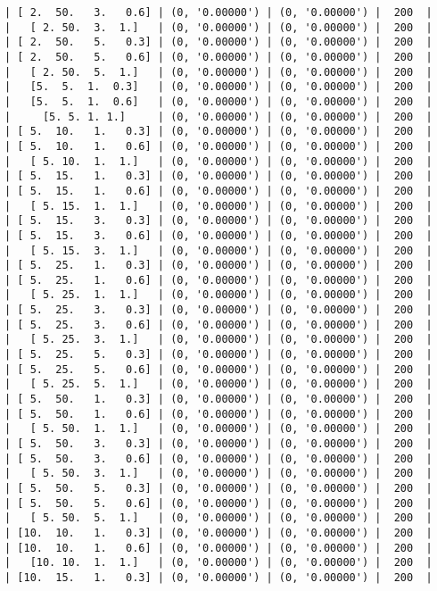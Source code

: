 \documentclass{article}
\begin{document}
\begin{verbatim}
| [ 2.  50.   3.   0.6] | (0, '0.00000') | (0, '0.00000') |  200  |
|   [ 2. 50.  3.  1.]   | (0, '0.00000') | (0, '0.00000') |  200  |
| [ 2.  50.   5.   0.3] | (0, '0.00000') | (0, '0.00000') |  200  |
| [ 2.  50.   5.   0.6] | (0, '0.00000') | (0, '0.00000') |  200  |
|   [ 2. 50.  5.  1.]   | (0, '0.00000') | (0, '0.00000') |  200  |
|   [5.  5.  1.  0.3]   | (0, '0.00000') | (0, '0.00000') |  200  |
|   [5.  5.  1.  0.6]   | (0, '0.00000') | (0, '0.00000') |  200  |
|     [5. 5. 1. 1.]     | (0, '0.00000') | (0, '0.00000') |  200  |
| [ 5.  10.   1.   0.3] | (0, '0.00000') | (0, '0.00000') |  200  |
| [ 5.  10.   1.   0.6] | (0, '0.00000') | (0, '0.00000') |  200  |
|   [ 5. 10.  1.  1.]   | (0, '0.00000') | (0, '0.00000') |  200  |
| [ 5.  15.   1.   0.3] | (0, '0.00000') | (0, '0.00000') |  200  |
| [ 5.  15.   1.   0.6] | (0, '0.00000') | (0, '0.00000') |  200  |
|   [ 5. 15.  1.  1.]   | (0, '0.00000') | (0, '0.00000') |  200  |
| [ 5.  15.   3.   0.3] | (0, '0.00000') | (0, '0.00000') |  200  |
| [ 5.  15.   3.   0.6] | (0, '0.00000') | (0, '0.00000') |  200  |
|   [ 5. 15.  3.  1.]   | (0, '0.00000') | (0, '0.00000') |  200  |
| [ 5.  25.   1.   0.3] | (0, '0.00000') | (0, '0.00000') |  200  |
| [ 5.  25.   1.   0.6] | (0, '0.00000') | (0, '0.00000') |  200  |
|   [ 5. 25.  1.  1.]   | (0, '0.00000') | (0, '0.00000') |  200  |
| [ 5.  25.   3.   0.3] | (0, '0.00000') | (0, '0.00000') |  200  |
| [ 5.  25.   3.   0.6] | (0, '0.00000') | (0, '0.00000') |  200  |
|   [ 5. 25.  3.  1.]   | (0, '0.00000') | (0, '0.00000') |  200  |
| [ 5.  25.   5.   0.3] | (0, '0.00000') | (0, '0.00000') |  200  |
| [ 5.  25.   5.   0.6] | (0, '0.00000') | (0, '0.00000') |  200  |
|   [ 5. 25.  5.  1.]   | (0, '0.00000') | (0, '0.00000') |  200  |
| [ 5.  50.   1.   0.3] | (0, '0.00000') | (0, '0.00000') |  200  |
| [ 5.  50.   1.   0.6] | (0, '0.00000') | (0, '0.00000') |  200  |
|   [ 5. 50.  1.  1.]   | (0, '0.00000') | (0, '0.00000') |  200  |
| [ 5.  50.   3.   0.3] | (0, '0.00000') | (0, '0.00000') |  200  |
| [ 5.  50.   3.   0.6] | (0, '0.00000') | (0, '0.00000') |  200  |
|   [ 5. 50.  3.  1.]   | (0, '0.00000') | (0, '0.00000') |  200  |
| [ 5.  50.   5.   0.3] | (0, '0.00000') | (0, '0.00000') |  200  |
| [ 5.  50.   5.   0.6] | (0, '0.00000') | (0, '0.00000') |  200  |
|   [ 5. 50.  5.  1.]   | (0, '0.00000') | (0, '0.00000') |  200  |
| [10.  10.   1.   0.3] | (0, '0.00000') | (0, '0.00000') |  200  |
| [10.  10.   1.   0.6] | (0, '0.00000') | (0, '0.00000') |  200  |
|   [10. 10.  1.  1.]   | (0, '0.00000') | (0, '0.00000') |  200  |
| [10.  15.   1.   0.3] | (0, '0.00000') | (0, '0.00000') |  200  |

\end{verbatim}
\end{document}
